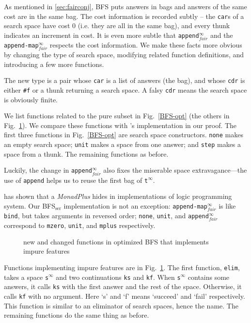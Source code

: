 \documentclass[format=acmlarge, review=true, authordraft=true]{acmart}
\newcommand{\BFSser}[0]{BFS$_\textrm{ser}$}
\begin{document}
As mentioned in \autoref{sec:fairconj}, BFS puts answers in bags and 
answers of the 
same cost are in the same bag. The cost
information is recorded subtly -- the \texttt{car}s of a search space have cost 
0 (i.e. they are all in the same bag), and every thunk indicates an increment 
in cost. It is even more subtle that
\texttt{append$^\infty_{fair}$} and the \texttt{append-map$^\infty_{fair}$} 
respects the cost information. We make these facts more obvious by 
changing the type of search space, modifying related function definitions, 
and introducing a few more functions.

The new type is a pair whose \texttt{car} is a list of answers (the bag), and 
whose \texttt{cdr} is either \texttt{\#{}f} or a thunk returning a search 
space. A falsy \texttt{cdr} means the search space is obviously finite. 

We list functions related to the pure subset in Fig.~\ref{BFS-opt} (the 
others in Fig.~\ref{BFS-opt-cont}). We compare these functions with 
\citeauthor{seres1999algebra}'s implementation in our proof. The first three 
functions in Fig.~\ref{BFS-opt} are search space constructors. \texttt{none} 
makes an empty search space; \texttt{unit} makes a space from one answer; and 
\texttt{step} makes a space from a thunk. The remaining functions as before.

Luckily, the change in \texttt{append$^\infty_{fair}$} also fixes the miserable 
space 
extravagance---the use of \texttt{append} helps us to reuse the first bag of 
\texttt{t$^\infty$}.

\citet{kiselyov2005backtracking} has shown that a \emph{MonadPlus} hides in 
implementations of logic programming system. Our \BFSser{} implementation is 
not an exception: \texttt{append-map$^\infty_{fair}$} is like \texttt{bind}, 
but takes arguments in reversed order; \texttt{none}, \texttt{unit}, and 
\texttt{append$^\infty_{fair}$} correspond to \texttt{mzero}, \texttt{unit}, 
and \texttt{mplus} respectively.

\begin{figure}
		
	\caption{new and changed functions in optimized BFS that implements impure 
		features}
	\label{BFS-opt-cont}
\end{figure}

Functions implementing impure features are in Fig.~\ref{BFS-opt-cont}. The 
first function, \texttt{elim}, takes a space \texttt{s$^\infty$} and two 
continuations \texttt{ks} and \texttt{kf}. When \texttt{s$^\infty$} contains 
some 
answers, it calls \texttt{ks} with the first answer and the rest of the space. 
Otherwise, it calls \texttt{kf} with no argument. Here `s' and `f' means 
`succeed' and `fail' respectively. This function is similar to an eliminator of 
search spaces, hence the name. The remaining functions do the same thing as 
before.
\end{document}
